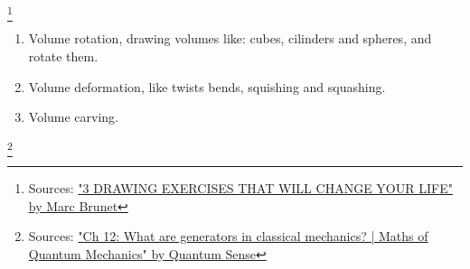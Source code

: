 \footnote{Sources:
  \href{https://youtu.be/WUcYTAiCQyQ?si=vXJLxQDlKPPz1_AA}
  {"3 DRAWING EXERCISES THAT WILL CHANGE YOUR LIFE" by Marc Brunet}}
\begin{enumerate}
\item Volume rotation, drawing volumes like: cubes, cilinders and spheres, and rotate them.
\item Volume deformation, like twists bends, squishing and squashing.
\item Volume carving.
\end{enumerate}


\footnote{Sources:
  \href{https://youtu.be/lJorwy0BQGU?si=88H2V0VSIbd8cjyr}
  {"Ch 12: What are generators in classical mechanics? | Maths of Quantum Mechanics" by Quantum Sense}}

